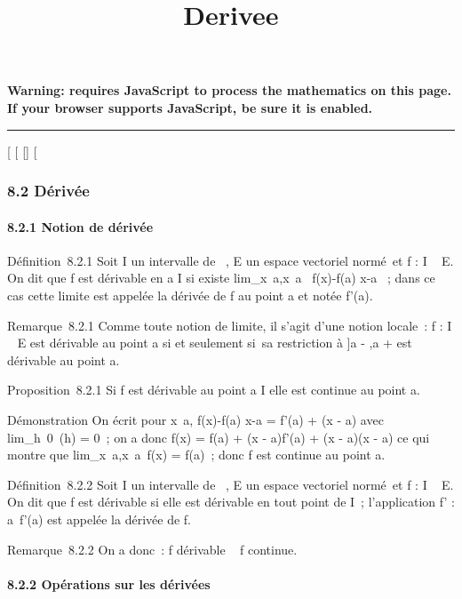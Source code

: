 \documentclass[]{article}
\title{Derivee}
\author{}
\date{}
\begin{document}
\maketitle

\textbf{Warning: 
requires JavaScript to process the mathematics on this page.\\ If your
browser supports JavaScript, be sure it is enabled.}

\begin{center}\rule{3in}{0.4pt}\end{center}

{[}
{[}
{[}{]}
{[}

\subsubsection{8.2 Dérivée}

\paragraph{8.2.1 Notion de dérivée}

Définition~8.2.1 Soit I un intervalle de ~, E un espace vectoriel
normé~et f : I \rightarrow~ E. On dit que f est dérivable en a \in I si existe
lim_x\rightarrow~a,x\neq~a~
f(x)-f(a) \over x-a ~; dans ce cas cette limite est
appelée la dérivée de f au point a et notée f'(a).

Remarque~8.2.1 Comme toute notion de limite, il s'agit d'une notion
locale~: f : I \rightarrow~ E est dérivable au point a si et seulement si~sa
restriction à {]}a - \eta,a + \eta{[}\bigcapI est dérivable au point a.

Proposition~8.2.1 Si f est dérivable au point a \in I elle est continue au
point a.

Démonstration On écrit pour x\neq~a,  f(x)-f(a)
\over x-a = f'(a) + \epsilon(x - a) avec
lim_h\rightarrow~0~\epsilon(h) = 0~; on a donc f(x) =
f(a) + (x - a)f'(a) + (x - a)\epsilon(x - a) ce qui montre que
lim_x\rightarrow~a,x\neq~a~f(x)
= f(a)~; donc f est continue au point a.

Définition~8.2.2 Soit I un intervalle de ~, E un espace vectoriel
normé~et f : I \rightarrow~ E. On dit que f est dérivable si elle est dérivable en
tout point de I~; l'application f' : a\mapsto~f'(a)
est appelée la dérivée de f.

Remarque~8.2.2 On a donc~: f dérivable \rigtharrow~ f continue.

\paragraph{8.2.2 Opérations sur les dérivées}
\end{document}
